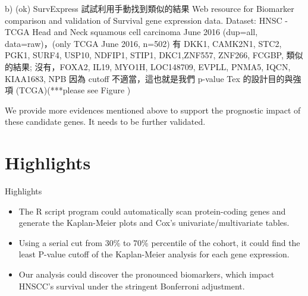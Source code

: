 \documentclass[preprint,12pt]{elsarticle}
\begin{document}
b) (ok) SurvExpress
試試利用手動找到類似的結果 Web resource for Biomarker comparison and validation of Survival gene expression data. 
Dataset: HNSC - TCGA Head and Neck squamous cell carcinoma June 2016 (dup=all, data=raw)，(only TCGA June 2016, n=502) \cite{Aguirre-Gamboa2013}
有  DKK1, CAMK2N1, STC2, PGK1, SURF4, USP10, NDFIP1, STIP1, DKC1,ZNF557, ZNF266, FCGBP,  類似的結果;
沒有，FOXA2, IL19, MYO1H, LOC148709, EVPLL, PNMA5, IQCN, KIAA1683, NPB
因為 cutoff 不適當，這也就是我們 p-value Tex 的設計目的與強項
 (TCGA)(***please see Figure \label{fig_SurvExpress})

We provide more evidences mentioned above to support the prognostic impact of these candidate genes. It needs to be further validated.



\section{Highlights}
Highlights
\begin{itemize}
    \item The R script program could automatically scan protein-coding genes and generate the Kaplan-Meier plots and Cox's univariate/multivariate tables.
    \item Using a serial cut from 30\% to 70\% percentile of the cohort, it could find the least P-value cutoff of the Kaplan-Meier analysis for each gene expression.
    \item Our analysis could discover the pronounced biomarkers, which impact HNSCC's survival under the stringent Bonferroni adjustment.
\end{itemize}



%

\end{document}
